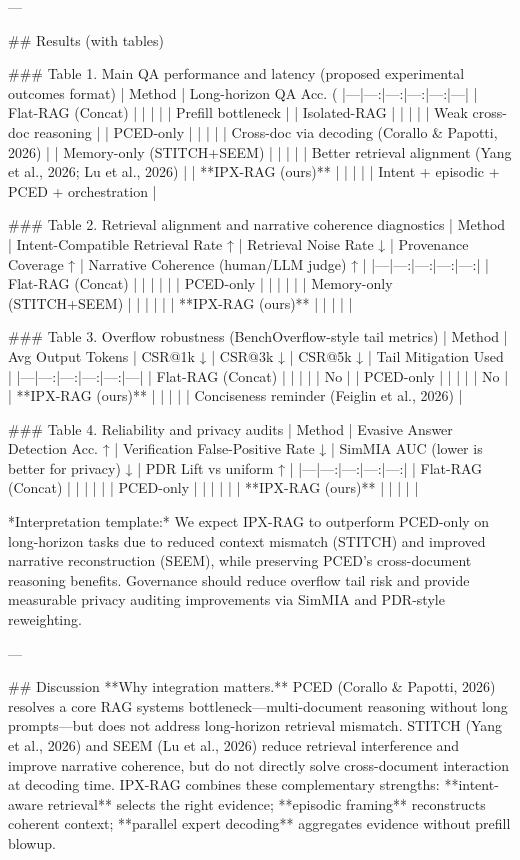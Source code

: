 ---

## Results (with tables)  

### Table 1. Main QA performance and latency (proposed experimental outcomes format)  
| Method | Long-horizon QA Acc. (%
|---|---:|---:|---:|---:|---|
| Flat-RAG (Concat) |  |  |  |  | Prefill bottleneck |
| Isolated-RAG |  |  |  |  | Weak cross-doc reasoning |
| PCED-only |  |  |  |  | Cross-doc via decoding (Corallo & Papotti, 2026) |
| Memory-only (STITCH+SEEM) |  |  |  |  | Better retrieval alignment (Yang et al., 2026; Lu et al., 2026) |
| **IPX-RAG (ours)** |  |  |  |  | Intent + episodic + PCED + orchestration |

### Table 2. Retrieval alignment and narrative coherence diagnostics  
| Method | Intent-Compatible Retrieval Rate ↑ | Retrieval Noise Rate ↓ | Provenance Coverage ↑ | Narrative Coherence (human/LLM judge) ↑ |
|---|---:|---:|---:|---:|
| Flat-RAG (Concat) |  |  |  |  |
| PCED-only |  |  |  |  |
| Memory-only (STITCH+SEEM) |  |  |  |  |
| **IPX-RAG (ours)** |  |  |  |  |

### Table 3. Overflow robustness (BenchOverflow-style tail metrics)  
| Method | Avg Output Tokens | CSR@1k ↓ | CSR@3k ↓ | CSR@5k ↓ | Tail Mitigation Used |
|---|---:|---:|---:|---:|---|
| Flat-RAG (Concat) |  |  |  |  | No |
| PCED-only |  |  |  |  | No |
| **IPX-RAG (ours)** |  |  |  |  | Conciseness reminder (Feiglin et al., 2026) |

### Table 4. Reliability and privacy audits  
| Method | Evasive Answer Detection Acc. ↑ | Verification False-Positive Rate ↓ | SimMIA AUC (lower is better for privacy) ↓ | PDR Lift vs uniform ↑ |
|---|---:|---:|---:|---:|
| Flat-RAG (Concat) |  |  |  |  |
| PCED-only |  |  |  |  |
| **IPX-RAG (ours)** |  |  |  |  |

*Interpretation template:* We expect IPX-RAG to outperform PCED-only on long-horizon tasks due to reduced context mismatch (STITCH) and improved narrative reconstruction (SEEM), while preserving PCED’s cross-document reasoning benefits. Governance should reduce overflow tail risk and provide measurable privacy auditing improvements via SimMIA and PDR-style reweighting.

---

## Discussion  
**Why integration matters.** PCED (Corallo & Papotti, 2026) resolves a core RAG systems bottleneck—multi-document reasoning without long prompts—but does not address long-horizon retrieval mismatch. STITCH (Yang et al., 2026) and SEEM (Lu et al., 2026) reduce retrieval interference and improve narrative coherence, but do not directly solve cross-document interaction at decoding time. IPX-RAG combines these complementary strengths: **intent-aware retrieval** selects the right evidence; **episodic framing** reconstructs coherent context; **parallel expert decoding** aggregates evidence without prefill blowup.

